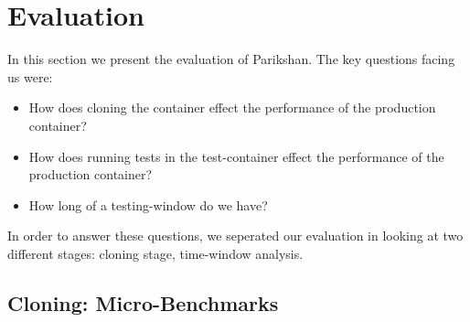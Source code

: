 \section{Evaluation}
\label{sec:evaluation}
In this section we present the evaluation of Parikshan. 
The key questions facing us were:
\begin{itemize}
   \item How does cloning the container effect the performance of the production container?
   \item How does running tests in the test-container effect the performance of the production container?
   \item How long of a testing-window do we have? 
\end{itemize}

In order to answer these questions, we seperated our evaluation in looking at two different stages: cloning stage, time-window analysis.

\subsection{Cloning: Micro-Benchmarks}
\label{sec:performance}

